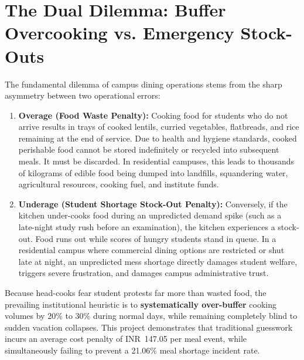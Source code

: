 \documentclass[11pt,a4paper,oneside]{report}
\newcommand{\inr}{\textsf{INR~}}
\begin{document}
\section{The Dual Dilemma: Buffer Overcooking vs. Emergency Stock-Outs}
The fundamental dilemma of campus dining operations stems from the sharp asymmetry between two operational errors:
\begin{enumerate}[label=\textbf{(\alph*)}]
  \item \textbf{Overage (Food Waste Penalty):} Cooking food for students who do not arrive results in trays of cooked lentils, curried vegetables, flatbreads, and rice remaining at the end of service. Due to health and hygiene standards, cooked perishable food cannot be stored indefinitely or recycled into subsequent meals. It must be discarded. In residential campuses, this leads to thousands of kilograms of edible food being dumped into landfills, squandering water, agricultural resources, cooking fuel, and institute funds.
  \item \textbf{Underage (Student Shortage Stock-Out Penalty):} Conversely, if the kitchen under-cooks food during an unpredicted demand spike (such as a late-night study rush before an examination), the kitchen experiences a stock-out. Food runs out while scores of hungry students stand in queue. In a residential campus where commercial dining options are restricted or shut late at night, an unpredicted mess shortage directly damages student welfare, triggers severe frustration, and damages campus administrative trust.
\end{enumerate}

Because head-cooks fear student protests far more than wasted food, the prevailing institutional heuristic is to \textbf{systematically over-buffer} cooking volumes by 20\% to 30\% during normal days, while remaining completely blind to sudden vacation collapses. This project demonstrates that traditional guesswork incurs an average cost penalty of \inr 147.05 per meal event, while simultaneously failing to prevent a 21.06\% meal shortage incident rate.
\end{document}

